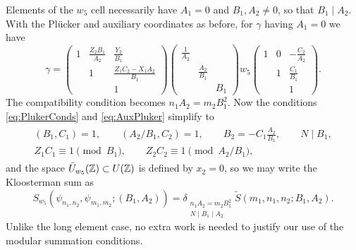 \documentclass[11pt]{amsart}
\theoremstyle{plain}
\numberwithin{equation}{section}
\theoremstyle{definition}
\begin{document}
Elements of the $w_5$ cell necessarily have $A_1 = 0$ and $B_1,A_2 \ne 0$, so that $B_1 \mid  A_2$.
With the Pl\"ucker and auxiliary coordinates as before, for $\gamma$ having $A_1=0$ we have
\[ \gamma = \left(\begin{matrix}1&\frac{Z_2 B_1}{A_2}&\frac{Y_2}{B_1} \\&1&\frac{Z_1 C_2-X_1 A_2}{B_1}\\&&1\end{matrix}\right) \left(\begin{matrix}\frac{1}{A_2}\\&\frac{A_2}{B_1}\\&&B_1\end{matrix}\right) w_5 \left(\begin{matrix}1&0&-\frac{C_2}{A_2} \\&1&\frac{C_1}{B_1}\\&&1\end{matrix}\right). \]
The compatibility condition becomes $n_1 A_2=m_2 B_1^2$.
Now the conditions \eqref{eq:PlukerConds} and \eqref{eq:AuxPluker} simplify to
\begin{align*}
\begin{array}{l}
	(B_1,C_1)=1, \qquad (A_2/B_1,C_2)=1, \qquad B_2 = -C_1 \frac{A_2}{B_1}, \qquad N\mid B_1, \\
	Z_1 C_1 \equiv 1 \pmod{B_1}, \qquad Z_2 C_2 \equiv 1 \pmod{A_2/B_1},
\end{array}
\end{align*}
and the space $\bar{U}_{w_5}(\Bbb{Z}) \subset U(\Bbb{Z})$ is defined by $x_2=0$, so we may write the Kloosterman sum as
\[ S_{w_5}(\psi_{n_1,n_2},\psi_{m_1,m_2};(B_1,A_2)) = \delta_{\substack{n_1 A_2=m_2 B_1^2 \\ N\mid B_1\mid A_2}} \tilde{S}(m_1,n_1,n_2;B_1,A_2). \] 
Unlike the long element case, no extra work is needed to justify our use of the modular summation conditions.
\end{document}

